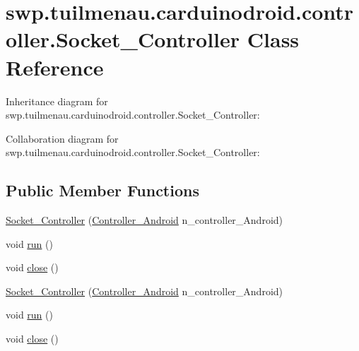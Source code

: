 \hypertarget{classswp_1_1tuilmenau_1_1carduinodroid_1_1controller_1_1_socket___controller}{}\section{swp.\+tuilmenau.\+carduinodroid.\+controller.\+Socket\+\_\+\+Controller Class Reference}
\label{classswp_1_1tuilmenau_1_1carduinodroid_1_1controller_1_1_socket___controller}


Inheritance diagram for swp.\+tuilmenau.\+carduinodroid.\+controller.\+Socket\+\_\+\+Controller\+:


Collaboration diagram for swp.\+tuilmenau.\+carduinodroid.\+controller.\+Socket\+\_\+\+Controller\+:
\subsection*{Public Member Functions}
\begin{DoxyCompactItemize}
\item 
\hyperlink{classswp_1_1tuilmenau_1_1carduinodroid_1_1controller_1_1_socket___controller_ab69baec0ffe38654dade8dff77c3767e}{Socket\+\_\+\+Controller} (\hyperlink{classswp_1_1tuilmenau_1_1carduinodroid_1_1controller_1_1_controller___android}{Controller\+\_\+\+Android} n\+\_\+controller\+\_\+\+Android)
\item 
void \hyperlink{classswp_1_1tuilmenau_1_1carduinodroid_1_1controller_1_1_socket___controller_a490674a59c3992603e27ef75821e61d6}{run} ()
\item 
void \hyperlink{classswp_1_1tuilmenau_1_1carduinodroid_1_1controller_1_1_socket___controller_a08ccd8feecfa1c15480137de90e24d23}{close} ()
\item 
\hyperlink{classswp_1_1tuilmenau_1_1carduinodroid_1_1controller_1_1_socket___controller_ab69baec0ffe38654dade8dff77c3767e}{Socket\+\_\+\+Controller} (\hyperlink{classswp_1_1tuilmenau_1_1carduinodroid_1_1controller_1_1_controller___android}{Controller\+\_\+\+Android} n\+\_\+controller\+\_\+\+Android)
\item 
void \hyperlink{classswp_1_1tuilmenau_1_1carduinodroid_1_1controller_1_1_socket___controller_a490674a59c3992603e27ef75821e61d6}{run} ()
\item 
void \hyperlink{classswp_1_1tuilmenau_1_1carduinodroid_1_1controller_1_1_socket___controller_a08ccd8feecfa1c15480137de90e24d23}{close} ()
\end{DoxyCompactItemize}


